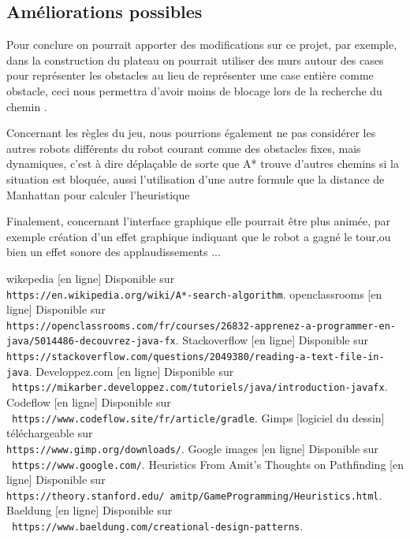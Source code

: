 \documentclass[12pt, a4paper, openany]{article}
\begin{document}
\subsection{Améliorations possibles}
Pour conclure on pourrait apporter des modifications sur ce projet, par exemple, dans la construction du plateau on pourrait utiliser des murs autour des cases pour représenter les obstacles au lieu de représenter une case entière comme obstacle, ceci nous permettra d’avoir moins de blocage lors de la recherche du chemin .
\par
Concernant les règles du jeu, nous pourrions également ne pas considérer les autres robots différents du robot courant comme des obstacles fixes, mais dynamiques, c'est à dire déplaçable de sorte que A* trouve d'autres chemins si la situation est bloquée, aussi l'utilisation d'une autre formule que la distance de Manhattan pour calculer l’heuristique
\par
Finalement, concernant l'interface graphique elle pourrait être plus animée,  par exemple création d'un effet graphique indiquant que le robot a gagné le tour,ou bien un effet sonore des applaudissements ... 

\newpage
\begin{thebibliography}{1}
 wikepedia [en ligne] Disponible sur  \\\texttt{https://en.wikipedia.org/wiki/A*-search-algorithm}.
 openclassrooms [en ligne] Disponible sur  \\\texttt{https://openclassrooms.com/fr/courses/26832-apprenez-a-programmer-en-java/5014486-decouvrez-java-fx}.
  Stackoverflow [en ligne] Disponible sur  \\\texttt{https://stackoverflow.com/questions/2049380/reading-a-text-file-in-java}.
  Developpez.com [en ligne] Disponible sur  \\\texttt{ https://mikarber.developpez.com/tutoriels/java/introduction-javafx}.
 Codeflow [en ligne] Disponible sur  \\\texttt{ https://www.codeflow.site/fr/article/gradle}.
 Gimps [logiciel du dessin] téléchargeable sur \\\texttt{https://www.gimp.org/downloads/}.
 Google images [en ligne] Disponible sur \\\texttt{ https://www.google.com/}.
 Heuristics From Amit’s Thoughts on Pathfinding [en ligne] Disponible sur  \\\texttt{https://theory.stanford.edu/~amitp/GameProgramming/Heuristics.html}.
 Baeldung [en ligne] Disponible sur \\\texttt{ https://www.baeldung.com/creational-design-patterns}.
\end{thebibliography}
\end{document}
